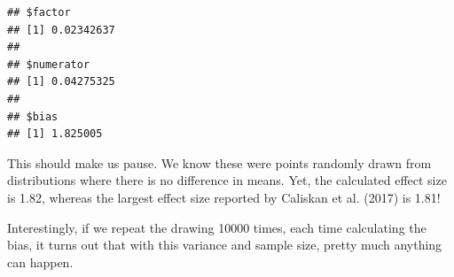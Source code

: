 \documentclass[10pt,dvipsnames,enabledeprecatedfontcommands]{scrartcl}
\begin{document}
\begin{verbatim}
## $factor
## [1] 0.02342637
## 
## $numerator
## [1] 0.04275325
## 
## $bias
## [1] 1.825005
\end{verbatim}

\normalsize

\noindent This should make us pause. We know these were points randomly
drawn from distributions where there is no difference in means. Yet, the
calculated effect size is 1.82, whereas the largest effect size reported
by Caliskan et al. (2017) is 1.81!

Interestingly, if we repeat the drawing 10000 times, each time
calculating the bias, it turns out that with this variance and sample
size, pretty much anything can happen.

\vspace{1mm} \footnotesize
\end{document}
